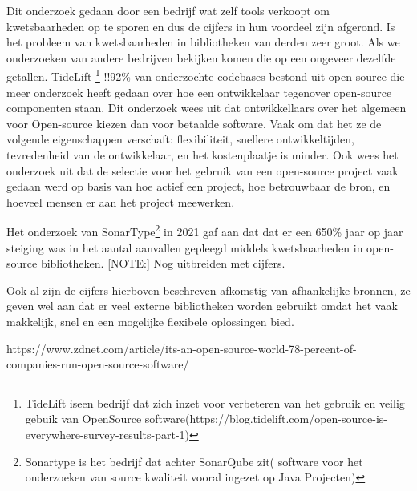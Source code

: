 Dit onderzoek gedaan door een bedrijf wat zelf tools verkoopt om kwetsbaarheden op te sporen en dus de cijfers in hun voordeel zijn afgerond. Is het probleem van kwetsbaarheden in bibliotheken van derden zeer groot. Als we onderzoeken van andere bedrijven bekijken komen die op een ongeveer dezelfde getallen. TideLift
\footnote{TideLift iseen bedrijf dat zich inzet voor verbeteren van het gebruik en veilig gebuik van OpenSource software(https://blog.tidelift.com/open-source-is-everywhere-survey-results-part-1)} !!92\% van onderzochte codebases bestond uit open-source
die meer onderzoek heeft gedaan over hoe een ontwikkelaar tegenover open-source componenten staan. Dit onderzoek wees uit dat ontwikkellaars over het algemeen voor Open-source kiezen dan voor betaalde software. Vaak om dat het ze de volgende eigenschappen verschaft:  flexibiliteit, snellere ontwikkeltijden, tevredenheid van de ontwikkelaar, en het kostenplaatje is minder. Ook wees het onderzoek uit dat de selectie voor het gebruik van een open-source project vaak gedaan werd op basis van hoe actief een project, hoe betrouwbaar de bron, en hoeveel mensen er aan het project meewerken.

Het onderzoek van SonarType\footnote{Sonartype is het bedrijf dat achter SonarQube zit( software voor het onderzoeken van source kwaliteit vooral ingezet op Java Projecten)} in 2021 gaf aan dat dat er een 650\% jaar op jaar steiging was in het aantal aanvallen gepleegd middels kwetsbaarheden in open-source bibliotheken.
[NOTE:] Nog uitbreiden met cijfers.

Ook al zijn de cijfers hierboven beschreven afkomstig van afhankelijke bronnen, ze geven wel aan dat er veel externe bibliotheken worden gebruikt omdat het vaak makkelijk, snel en een mogelijke flexibele oplossingen bied.

https://www.zdnet.com/article/its-an-open-source-world-78-percent-of-companies-run-open-source-software/

